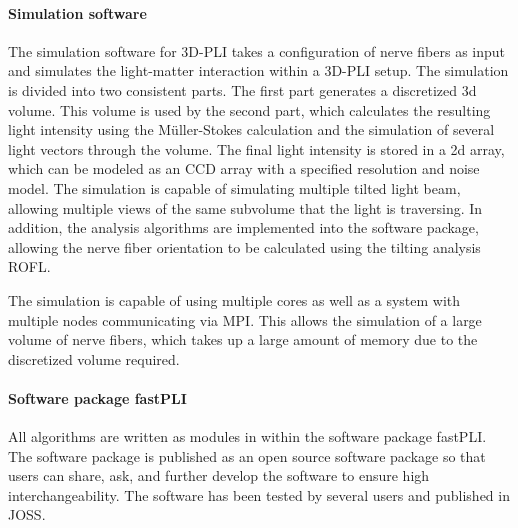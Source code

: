 \paragraph{Simulation software}
% 
The simulation software for \ac{3D-PLI} takes a configuration of nerve fibers as input and simulates the light-matter interaction within a \ac{3D-PLI} setup.
The simulation is divided into two consistent parts.
The first part generates a discretized 3d volume.
This volume is used by the second part, which calculates the resulting light intensity using the M\"{u}ller-Stokes calculation and the simulation of several light vectors through the volume.
The final light intensity is stored in a 2d array, which can be modeled as an \ac{CCD} array with a specified resolution and noise model.
The simulation is capable of simulating multiple tilted light beam, allowing multiple views of the same subvolume that the light is traversing.
In addition, the analysis algorithms are implemented into the software package, allowing the nerve fiber orientation to be calculated using the tilting analysis \ac{ROFL}.
\par
% 
The simulation is capable of using multiple cores as well as a system with multiple nodes communicating via \ac{MPI}.
This allows the simulation of a large volume of nerve fibers, which takes up a large amount of memory due to the discretized volume required.
% 
% 
% 
\paragraph{Software package \acs{fastPLI}}
% 
All algorithms are written as modules in \python{} within the software package \ac{fastPLI}.
The software package is published as an open source software package so that users can share, ask, and further develop the software to ensure high interchangeability. 
The software has been tested by several users and published in \ac{JOSS}.
% 
% 
% 
